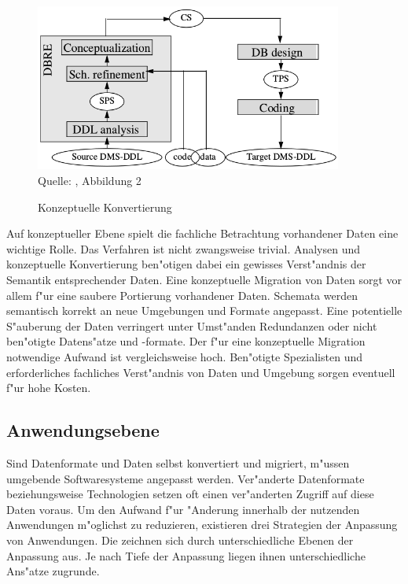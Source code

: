 \begin{figure}[h!]
	\centering
	\caption{Konzeptuelle Konvertierung}
	\label{pic:conversion_conceptual}
	\includegraphics[width=0.9\textwidth]{../images/strategies_fig_02b.png} \\
	\tiny Quelle: \citep{henrard-2002}, Abbildung 2
\end{figure}

Auf konzeptueller Ebene spielt die fachliche Betrachtung vorhandener Daten eine wichtige Rolle. Das Verfahren ist nicht zwangsweise trivial. Analysen und konzeptuelle Konvertierung ben"otigen dabei ein gewisses Verst"andnis der Semantik entsprechender Daten.
\lb
Eine konzeptuelle Migration von Daten sorgt vor allem f"ur eine saubere Portierung vorhandener Daten. Schemata werden semantisch korrekt an neue Umgebungen und Formate angepasst. Eine potentielle S"auberung der Daten verringert unter Umst"anden Redundanzen oder nicht ben"otigte Datens"atze und -formate.
\lb
Der f"ur eine konzeptuelle Migration notwendige Aufwand ist vergleichsweise hoch. Ben"otigte Spezialisten und erforderliches fachliches Verst"andnis von Daten und Umgebung sorgen eventuell f"ur hohe Kosten.

\subsection{Anwendungsebene}

Sind Datenformate und Daten selbst konvertiert und migriert, m"ussen umgebende Softwaresysteme angepasst werden. Ver"anderte Datenformate beziehungsweise Technologien setzen oft einen ver"anderten Zugriff auf diese Daten voraus. Um den Aufwand f"ur "Anderung innerhalb der nutzenden Anwendungen m"oglichst zu reduzieren, existieren drei Strategien der Anpassung von Anwendungen. Die zeichnen sich durch unterschiedliche Ebenen der Anpassung aus. Je nach Tiefe der Anpassung liegen ihnen unterschiedliche Ans"atze zugrunde. 

